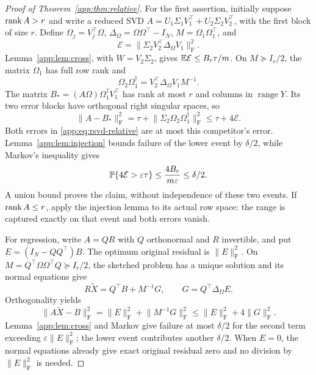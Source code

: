 \documentclass[11pt,a4paper]{article}
\theoremstyle{definition}\newtheorem{definition}[theorem]{Definition}
\theoremstyle{remark}\newtheorem{remark}[theorem]{Remark}
\numberwithin{equation}{section}
\newcommand{\Id}{I}\newcommand{\F}{\mathrm F}
\newcommand{\norm}[1]{\lVert#1\rVert}\newcommand{\ip}[2]{\langle#1,#2\rangle}
\DeclareMathOperator{\range}{range}\DeclareMathOperator{\diag}{diag}
\begin{document}
\begin{proof}[Proof of Theorem~\ref{app:thm:relative}]
For the first assertion, initially suppose $\operatorname{rank} A>r$ and write a reduced
SVD $A=U_1\Sigma_1V_1^\top+U_2\Sigma_2V_2^\top$, with the first block of
size $r$. Define $\Omega_j=V_j^\top\Omega$, $\Delta_\Omega =\Omega\Omega^\top-\Id_N$,
$M=\Omega_1\Omega_1^\top$, and
\[
 \mathcal E=\norm{\Sigma_2V_2^\top \Delta_\Omega V_1}_\F^2.
\]
Lemma~\ref{app:lem:cross}, with $W=V_2\Sigma_2$, gives
$\mathbb E \mathcal E\le B_r\tau/m$. On $M\succeq\Id_r/2$, the matrix $\Omega_1$ has full
row rank and
\[
 \Omega_2\Omega_1^\dagger=V_2^\top \Delta_\Omega V_1M^{-1}.
\]
The matrix $B_*=(A\Omega)\Omega_1^\dagger V_1^\top$ has rank at most $r$
and columns in $\range Y$. Its two error blocks have orthogonal right
singular spaces, so
\[
 \norm{A-B_*}_\F^2
 =\tau+\norm{\Sigma_2\Omega_2\Omega_1^\dagger}_\F^2
 \le\tau+4\mathcal E.
\]
Both errors in \eqref{app:eq:rsvd-relative} are at most this competitor's
error. Lemma~\ref{app:lem:injection} bounds failure of the lower event by
$\delta/2$, while Markov's inequality gives
\[
 \mathbb P\{4\mathcal E>\varepsilon\tau\}\le\frac{4B_r}{m\varepsilon}\le\delta/2.
\]
A union bound proves the claim, without independence of these two events.
If $\operatorname{rank} A\le r$, apply the injection lemma to its actual row space:
the range is captured exactly on that event and both errors vanish.

For regression, write $A=QR$ with $Q$ orthonormal and $R$ invertible, and
put $E=(\Id_N-QQ^\top)B$. The optimum original residual is $\norm E_\F^2$.
On $M=Q^\top\Omega\Omega^\top Q\succeq\Id_r/2$, the sketched problem has a
unique solution and its normal equations give
\[
 R\widetilde X=Q^\top B+M^{-1}G,
 \qquad G=Q^\top \Delta_\Omega  E.
\]
Orthogonality yields
\[
 \norm{A\widetilde X-B}_\F^2
 =\norm E_\F^2+\norm{M^{-1}G}_\F^2
 \le\norm E_\F^2+4\norm G_\F^2.
\]
Lemma~\ref{app:lem:cross} and Markov give failure at most $\delta/2$ for
the second term exceeding $\varepsilon\norm E_\F^2$; the lower event
contributes another $\delta/2$. When $E=0$, the normal equations already
give exact original residual zero and no division by $\norm E_\F^2$ is
needed. 
\end{proof}
\end{document}
